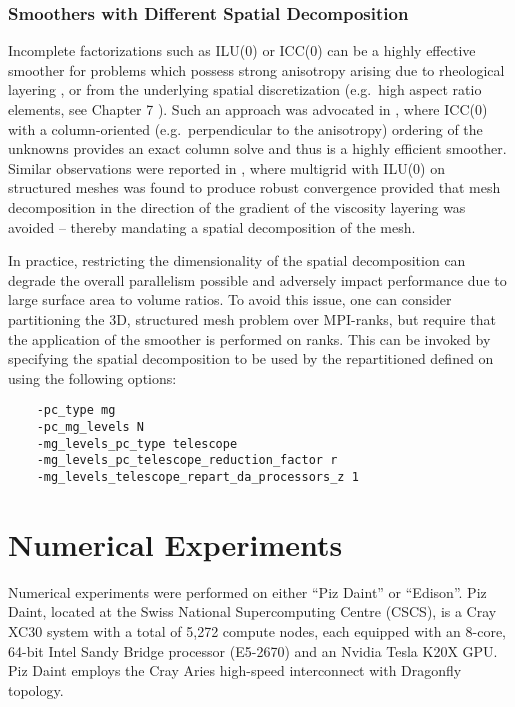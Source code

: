 \documentclass[]{siamart0216}
\begin{document}
\subsubsection{Smoothers with Different Spatial Decomposition}  \label{sec:ssdiffsd}


	Incomplete factorizations such as ILU(0) or ICC(0) can be a highly effective smoother 
	for problems which possess strong anisotropy arising due to rheological layering \cite{lechmann2011comparing}, or 
	from the underlying spatial discretization (e.g.~high aspect ratio elements, see Chapter 7 \cite{trottenberg2000multigrid}). 
	Such an approach was advocated in \cite{brown2013achieving, isaac.sisc.2015}, where ICC(0) with a 
	column-oriented (e.g.~perpendicular to the anisotropy) ordering of the unknowns  provides an exact column solve
	and thus is a highly efficient smoother. 
	Similar observations were reported in \cite{lechmann2011comparing}, where multigrid with 
	ILU(0) on structured meshes was found to produce robust convergence provided that mesh decomposition 
	in the direction of the gradient of the viscosity layering was avoided -- thereby mandating a  spatial decomposition of the mesh.
	
	In practice, restricting the dimensionality of the spatial decomposition can degrade the overall parallelism possible and 
	adversely impact performance due to large surface area to volume ratios. 
	To avoid this issue, one can consider partitioning the 3D, structured mesh problem over  MPI-ranks, 
	but require that the application of the smoother is performed on  ranks. 
	This can be invoked by specifying the spatial decomposition to be used by the repartitioned  defined on  
	using the following options:
\begin{tcolorbox}[colframe=red,colback=cornsilk,boxrule=0.5pt,arc=4pt,
      left=-6pt,right=6pt,top=6pt,bottom=6pt,boxsep=0pt]
	\begin{verbatim}
    -pc_type mg
    -pc_mg_levels N
    -mg_levels_pc_type telescope
    -mg_levels_pc_telescope_reduction_factor r
    -mg_levels_telescope_repart_da_processors_z 1
	\end{verbatim}
\end{tcolorbox}


\section{Numerical Experiments}

Numerical experiments were performed on either ``Piz Daint'' or ``Edison''.
Piz Daint, located at the Swiss National Supercomputing Centre (CSCS),  is a Cray XC30 system 
with a total of 5,272 compute nodes, each equipped with an 8-core, 
64-bit Intel Sandy Bridge processor (E5-2670) and an Nvidia Tesla K20X GPU.
Piz Daint employs the Cray Aries high-speed interconnect with Dragonfly topology. 
\end{document}
